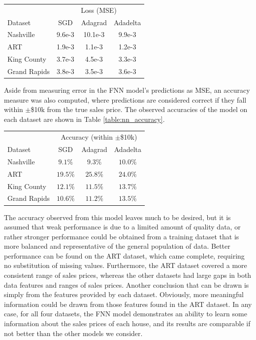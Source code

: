 \documentclass[10pt]{article}
\begin{document}
\begin{multicols}{2}
		\begin{center}
			\captionsetup{type=table}
			\begin{tabular}{l|c|c|c}
				& \multicolumn{3}{c}{Loss (MSE)} \\
				Dataset 		& SGD		& Adagrad	& Adadelta \\
				\hline
				Nashville 		& 9.6e-3 	& 10.1e-3 	& 9.9e-3 \\
				ART 			& 1.9e-3 	& 1.1e-3 	& 1.2e-3 \\
				King County 	& 3.7e-3 	& 4.5e-3 	& 3.3e-3 \\
				Grand Rapids 	& 3.8e-3 	& 3.5e-3 	& 3.6e-3 \\
			\end{tabular}
			\label{table:nn_performance}
		\end{center}
	
		Aside from measuring error in the FNN model's predictions as MSE, an accuracy measure was also computed, where predictions are considered correct if they fall within \(\pm\)\$10k from the true sales price. The observed accuracies of the model on each dataset are shown in Table \ref{table:nn_accuracy}.
		
		\begin{center}
		\captionsetup{type=table}
		\begin{tabular}{l|c|c|c}
			& \multicolumn{3}{c}{Accuracy (within \(\pm\)\$10k)} \\
			Dataset 		& SGD			& Adagrad		& Adadelta \\
			\hline
			Nashville		& \(9.1\%\)		& \(9.3\%\)		& \(10.0\%\) \\
			ART 			& \(19.5\%\) 	& \(25.8\%\)	& \(24.0\%\) \\
			King County 	& \(12.1\%\) 	& \(11.5\%\)	& \(13.7\%\) \\
			Grand Rapids 	& \(10.6\%\) 	& \(11.2\%\)	& \(13.5\%\) \\
		\end{tabular}
		\label{table:nn_accuracy}
		\end{center}
		
		The accuracy observed from this model leaves much to be desired, but it is assumed that weak performance is due to a limited amount of quality data, or rather stronger performance could be obtained from a training dataset that is more balanced and representative of the general population of data. Better performance can be found on the ART dataset, which came complete, requiring no substitution of missing values. Furthermore, the ART dataset covered a more consistent range of sales prices, whereas the other datasets had large gaps in both data features and ranges of sales prices. Another conclusion that can be drawn is simply from the features provided by each dataset. Obviously, more meaningful information could be drawn from those features found in the ART dataset. In any case, for all four datasets, the FNN model demonstrates an ability to learn some information about the sales prices of each house, and its results are comparable if not better than the other models we consider.
		

\end{multicols}
\end{document}
